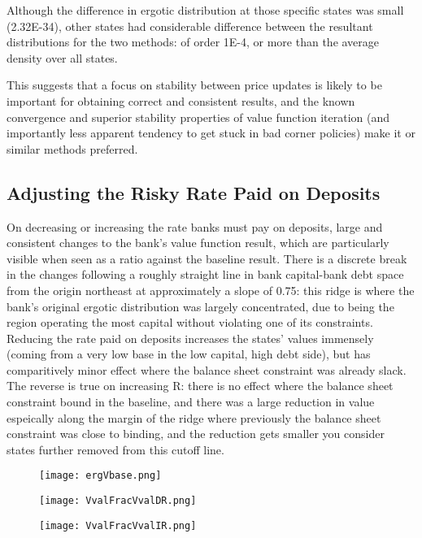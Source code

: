 \documentclass[english]{article}
\begin{document}
Although the difference in ergotic distribution at those specific states was small (2.32E-34), other 
states had considerable difference between the resultant distributions for the two methods: of order 
1E-4, or more than the average density over all states.

This suggests that a focus on stability between price updates is likely to be important for obtaining 
correct and consistent results, and the known convergence and superior stability properties of value 
function iteration (and importantly less apparent tendency to get stuck in bad corner policies) make it 
or similar methods preferred.

\subsection{Adjusting the Risky Rate Paid on Deposits}
On decreasing or increasing the rate banks must pay on deposits, large and consistent changes to the 
bank's value function result, which are particularly visible when seen as a ratio against the baseline 
result.  There is a discrete break in the changes following a roughly straight line in bank capital-bank debt 
space from the origin northeast at approximately a slope of 0.75: this ridge is where the bank's original 
ergotic distribution was largely concentrated, due to being the region operating the most capital without 
violating one of its constraints. Reducing the rate paid on deposits increases the states' values immensely 
(coming from a very low base in the low capital, high debt side), but has comparitively minor effect where 
the balance sheet constraint was already slack. The reverse is true on increasing R: there is no effect 
where the balance sheet constraint bound in the baseline, and there was a large reduction in value 
espeically along the margin of the ridge where previously the balance sheet constraint was close to 
binding, and the reduction gets smaller you consider states further removed from this cutoff line.

\begin{figure}[H]
\centering
		\texttt{[image: ergVbase.png]}
\end{figure}

\begin{figure}[H]
\centering
		\texttt{[image: VvalFracVvalDR.png]}
\end{figure}
\begin{figure}[H]
\centering
		\texttt{[image: VvalFracVvalIR.png]}
\end{figure}
\end{document}
